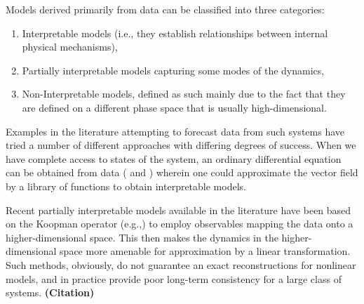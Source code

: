 \documentclass[a4paper,12pt,twoside]{report}
\begin{document}
Models derived primarily from data can be classified into three categories: 
\vspace{-8mm}
\begin{enumerate}[noitemsep, label=\roman*.]
  \item  Interpretable models (i.e., they establish relationships between internal physical mechanisms), 
  \item Partially interpretable models capturing some modes of the dynamics, 
  \item Non-Interpretable models, defined as such mainly due to the fact that they are defined on a different phase space that is usually high-dimensional. 
\end{enumerate}

Examples in the literature attempting to forecast data from such systems have tried a number of different approaches with differing degrees of success. 
When we have complete access to states of the system, an ordinary differential equation can be obtained from data (\cite{brunton2016discovering, champion2019data} and \cite{small2002modeling,xu2006modeling}) wherein one could approximate the vector field by a library of functions to obtain interpretable models. 


Recent partially interpretable models available in the literature have been based on the Koopman operator (e.g.,\cite{koopman1932dynamical,budivsic2012applied}) to  employ observables mapping the data onto a higher-dimensional space. This then makes the dynamics in the higher-dimensional space more amenable for approximation by a linear transformation. Such methods, obviously, do not guarantee an exact reconstructions for nonlinear models, and in practice provide poor long-term consistency for a large class of systems. \textbf{(Citation)}
\end{document}
